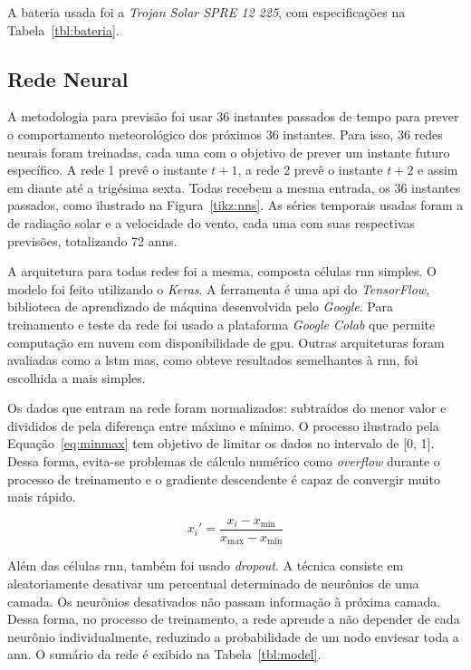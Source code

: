 A bateria usada foi a \emph{Trojan Solar SPRE 12 225}, com especificações na
Tabela~\ref{tbl:bateria}.



\subsection{Rede Neural}

A metodologia para previsão foi usar 36 instantes passados de tempo para prever
o comportamento meteorológico dos próximos 36 instantes.  Para isso, 36 redes
neurais foram treinadas, cada uma com o objetivo de prever um instante futuro
específico. A rede 1 prevê o instante $t+1$, a rede 2 prevê o instante $t+2$ e
assim em diante até a trigésima sexta. Todas recebem a mesma entrada, os 36
instantes passados, como ilustrado na Figura~\ref{tikz:nns}.  As séries
temporais usadas foram a de radiação solar e a velocidade do vento, cada uma com
suas respectivas previsões, totalizando 72 \acrshort{ann}s.



A arquitetura para todas redes foi a mesma, composta células \acrshort{rnn}
simples. O modelo foi feito utilizando o \emph{Keras}. A ferramenta é uma
\acrshort{api} do \emph{TensorFlow}, biblioteca de aprendizado de máquina
desenvolvida pelo \emph{Google}.  Para treinamento e teste da rede foi usado a
plataforma \emph{Google Colab} que permite computação em nuvem com
disponibilidade de \acrshort{gpu}. Outras arquiteturas foram avaliadas como a
\acrshort{lstm} mas, como obteve resultados semelhantes à \acrshort{rnn}, foi
escolhida a mais simples.

Os dados que entram na rede foram normalizados: subtraídos do menor valor e
divididos de pela diferença entre máximo e mínimo. O processo ilustrado pela
Equação~\ref{eq:minmax} tem objetivo de limitar os dados no intervalo de [0, 1].
Dessa forma, evita-se problemas de cálculo numérico como \emph{overflow} durante
o processo de treinamento e o gradiente descendente é capaz de convergir muito
mais rápido.

\begin{equation}
  \label{eq:minmax}   x_{i}' = \frac{x_{i} - x_{\text{min}}}{x_{\text{max}} - x_{\text{min}}}
\end{equation}

Além das células \acrshort{rnn}, também foi usado \emph{dropout}. A técnica
consiste em aleatoriamente desativar um percentual determinado de neurônios de
uma camada. Os neurônios desativados não passam informação à próxima camada.
Dessa forma, no processo de treinamento, a rede aprende a não depender de cada
neurônio individualmente, reduzindo a probabilidade de um nodo enviesar toda a
\acrshort{ann}. O sumário da rede é exibido na Tabela~\ref{tbl:model}.

